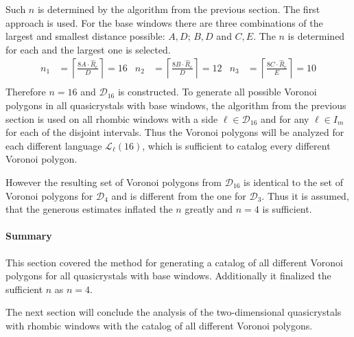 \documentclass[text.tex]{subfiles}
\begin{document}
Such $n$ is determined by the algorithm from the previous section. The first approach is used. For the base windows there are three combinations of the largest and smallest distance possible: $A,D$; $B,D$ and $C,E$. The $n$ is determined for each and the largest one is selected. 
\begin{align*}
n_1 &= \left\lceil\frac{8A\cdot\hat{R}_c}{D}\right\rceil = 16 & n_2 &= \left\lceil\frac{8B\cdot\hat{R}_c}{D}\right\rceil = 12 & n_3 &= \left\lceil\frac{8C\cdot\hat{R}_c}{E}\right\rceil = 10\\
\end{align*}
Therefore $n=16$ and $\mathcal{D}_{16}$ is constructed. To generate all possible Voronoi polygons in all quasicrystals with base windows, the algorithm from the previous section is used on all rhombic windows with a side $\ell\in\mathcal{D}_{16}$ and for any $\ell\in I_m$ for each of the disjoint intervals. Thus the Voronoi polygons will be analyzed for each different language $\mathcal{L}_\ell(16)$, which is sufficient to catalog every different Voronoi polygon. 

However the resulting set of Voronoi polygons from $\mathcal{D}_{16}$ is identical to the set of Voronoi polygons for $\mathcal{D}_4$ and is different from the one for $\mathcal{D}_3$. Thus it is assumed, that the generous estimates inflated the $n$ greatly and $n=4$ is sufficient.

\paragraph{Summary} This section covered the method for generating a catalog of all different Voronoi polygons for all quasicrystals with base windows. Additionally it finalized the sufficient $n$ as $n=4$.

The next section will conclude the analysis of the two-dimensional quasicrystals with rhombic windows with the catalog of all different Voronoi polygons.

\clearpage
\end{document}
